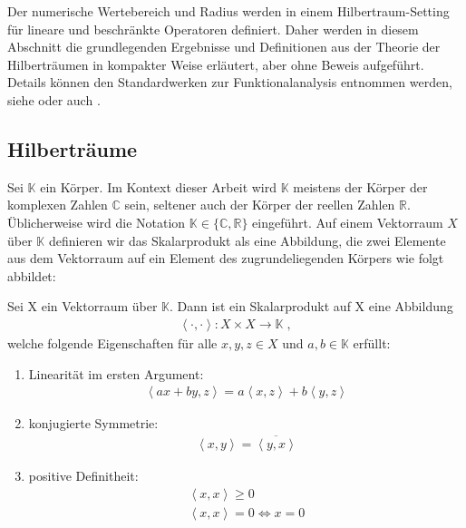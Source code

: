 Der numerische Wertebereich und Radius werden in einem Hilbertraum-Setting für lineare und beschränkte Operatoren definiert. Daher werden in diesem Abschnitt die grundlegenden Ergebnisse und Definitionen aus der Theorie der Hilberträumen in kompakter Weise erläutert, aber ohne Beweis aufgeführt. Details können den Standardwerken zur Funktionalanalysis entnommen werden, siehe \parencite[][Kapitel 5, 6]{werner2006funktionalanalysis} oder auch \parencite[][Kapitel 1,2, 6, 7]{conway2019course}.

\subsection{Hilberträume}

Sei $\mathbb{K}$ ein Körper. Im Kontext dieser Arbeit wird $\mathbb{K}$ meistens der Körper der komplexen Zahlen $\mathbb{C}$ sein, seltener auch der Körper der reellen Zahlen $\mathbb{R}$. Üblicherwei\-se wird die Notation $\mathbb{K} \in \{\mathbb{C}, \mathbb{R}\}$ eingeführt. Auf einem Vektorraum $X$ über $\mathbb{K}$ definieren wir das Skalarprodukt als eine Abbildung, die zwei Elemente aus dem Vektorraum auf ein Element des zugrundeliegenden Körpers wie folgt abbildet:

\begin{definition}[Skalarprodukt]
    Sei X ein Vektorraum über $\mathbb{K}$. Dann ist ein Skalarprodukt auf X eine Abbildung
    \begin{align*}
        \left<\cdot ,\cdot \right> : X \times X \longrightarrow \mathbb{K} \; ,
    \end{align*}
    welche folgende Eigenschaften für alle $ x,y,z \in X$ und $a, b \in \mathbb{K}$ erfüllt: \begin{enumerate}[label=(\roman*)]
        \item Linearität im ersten Argument: \begin{align*}
            \left< a x + b y, z \right> = a \left< x , z \right> +b \left< y, z \right>
        \end{align*}
        \item konjugierte Symmetrie: \begin{align*}
            \left< x,y \right> = \overline{\left< y,x \right>}
        \end{align*}
        \item  positive Definitheit: \begin{align*}
            \left< x,x \right> \ge 0 \\
            \left< x,x \right> = 0 \iff x = 0
        \end{align*}
    \end{enumerate}
\end{definition}

